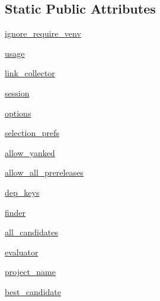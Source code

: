 \subsection*{Static Public Attributes}
\begin{DoxyCompactItemize}
\item 
\hyperlink{classpip_1_1__internal_1_1commands_1_1list_1_1ListCommand_aea8db9458b93a08523385fe7faf41ae7}{ignore\+\_\+require\+\_\+venv}
\item 
\hyperlink{classpip_1_1__internal_1_1commands_1_1list_1_1ListCommand_abfe8db95b24cb2ba1a1f68e6c65719cb}{usage}
\item 
\hyperlink{classpip_1_1__internal_1_1commands_1_1list_1_1ListCommand_aaef92d307d643ff37896d0b1e1162088}{link\+\_\+collector}
\item 
\hyperlink{classpip_1_1__internal_1_1commands_1_1list_1_1ListCommand_aa0a13ed78bdb86785201e725109d1769}{session}
\item 
\hyperlink{classpip_1_1__internal_1_1commands_1_1list_1_1ListCommand_a3b53dca0435a222f9ac8c361dd47c18b}{options}
\item 
\hyperlink{classpip_1_1__internal_1_1commands_1_1list_1_1ListCommand_a167a622396557edab4a13c278ea081e3}{selection\+\_\+prefs}
\item 
\hyperlink{classpip_1_1__internal_1_1commands_1_1list_1_1ListCommand_a882941e267b723026a4964258092a62a}{allow\+\_\+yanked}
\item 
\hyperlink{classpip_1_1__internal_1_1commands_1_1list_1_1ListCommand_ad3045950463c81b379268a8c3574fe5a}{allow\+\_\+all\+\_\+prereleases}
\item 
\hyperlink{classpip_1_1__internal_1_1commands_1_1list_1_1ListCommand_a265d996204401888896e2125aceb6663}{dep\+\_\+keys}
\item 
\hyperlink{classpip_1_1__internal_1_1commands_1_1list_1_1ListCommand_a61005e50c8a2b7721120ecf5f5a90223}{finder}
\item 
\hyperlink{classpip_1_1__internal_1_1commands_1_1list_1_1ListCommand_a32fde6963fafca03410d0cb8ca6ba489}{all\+\_\+candidates}
\item 
\hyperlink{classpip_1_1__internal_1_1commands_1_1list_1_1ListCommand_aa47169a0b6580b477286452b8d0d4ea8}{evaluator}
\item 
\hyperlink{classpip_1_1__internal_1_1commands_1_1list_1_1ListCommand_a56e82ea04a6bdcd9b03023756931d9a4}{project\+\_\+name}
\item 
\hyperlink{classpip_1_1__internal_1_1commands_1_1list_1_1ListCommand_a8013172553b8a41f21f5d4c84811af27}{best\+\_\+candidate}

\end{DoxyCompactItemize}
